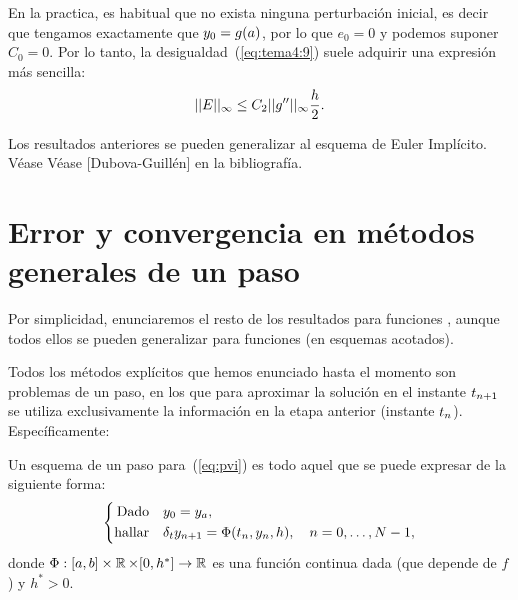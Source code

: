 \begin{remark}
  \label{rk:8}
  En la practica, es habitual que no exista ninguna perturbación
  inicial, es decir que tengamos exactamente que $y_0=g(a)$, por lo
  que $e_0=0$ y podemos suponer $C_0=0$. Por lo tanto, la
  desigualdad~(\ref{eq:tema4:9}) suele adquirir una expresión más
  sencilla:
    \begin{equation}
    \label{eq:tema4:9}
    ||E||_\infty \le C_2 ||g''||_\infty \frac h2.
  \end{equation}
\end{remark}

\begin{remark}
  Los resultados anteriores se pueden generalizar al esquema de Euler Implícito. Véase
  Véase [Dubova-Guillén] en la bibliografía.
\end{remark}

\section{Error y convergencia en métodos generales de un paso}
\label{sec:convergencia-metodos-1paso}

Por simplicidad, enunciaremos  el resto de los resultados para
funciones \globLipschitz, aunque todos ellos se pueden generalizar para
funciones \locLipschitz (en esquemas acotados). %


Todos los métodos explícitos que hemos enunciado hasta el momento son
problemas de un paso, en los que para aproximar la solución en el
instante ${t_{n+1}}$ se utiliza exclusivamente la información en la etapa
anterior (instante ${t_n}$). Específicamente:
\begin{definition}
  Un esquema de un paso para~(\ref{eq:pvi}) es todo aquel que se puede
  expresar de la siguiente forma:
  \begin{equation}
    \label{eq:pb-general-1paso}
    \left\{
      \begin{aligned}
        \text{Dado}\quad &y_0 = {y_a},\\
        \text{hallar}\quad &\delta_t {y_{n+1}} = \Phi({t_n},{y_n}, h), \quad
        n=0,\dots, N-1,
      \end{aligned}
    \right.
  \end{equation}
  donde $\Phi:[a,b]\times \operatorname{{\mathbb R}} \times [0,h^*] \to \operatorname{{\mathbb R}}$ es una
  función continua dada (que depende de $f$) y $h^*>0$.
\end{definition}

